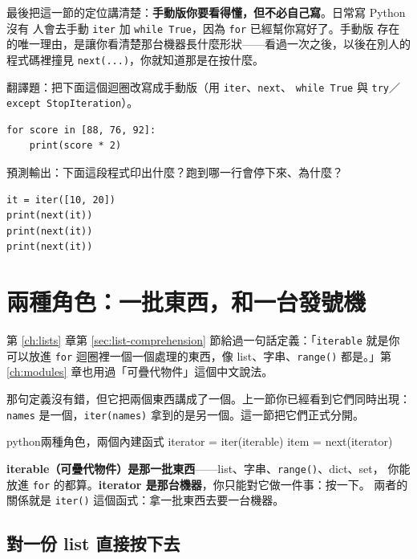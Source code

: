 最後把這一節的定位講清楚：\textbf{手動版你要看得懂，但不必自己寫}。日常寫 Python 沒有
人會去手動 \texttt{iter} 加 \texttt{while True}，因為 \texttt{for} 已經幫你寫好了。手動版
存在的唯一理由，是讓你看清楚那台機器長什麼形狀——看過一次之後，以後在別人的程式碼裡撞見
\texttt{next(...)}，你就知道那是在按什麼。

\begin{drills}[label=drills:what-for-does]
\item 翻譯題：把下面這個迴圈改寫成手動版（用 \texttt{iter}、\texttt{next}、
\texttt{while True} 與 \texttt{try}／\texttt{except StopIteration}）。
\begin{verbatim}
for score in [88, 76, 92]:
    print(score * 2)
\end{verbatim}
\item 預測輸出：下面這段程式印出什麼？跑到哪一行會停下來、為什麼？
\begin{verbatim}
it = iter([10, 20])
print(next(it))
print(next(it))
print(next(it))
\end{verbatim}
\end{drills}

\section{兩種角色：一批東西，和一台發號機}
\label{sec:iterable-vs-iterator}

第 \ref{ch:lists} 章第 \ref{sec:list-comprehension} 節給過一句話定義：「\texttt{iterable}
就是你可以放進 \texttt{for} 迴圈裡一個一個處理的東西，像 list、字串、\texttt{range()}
都是。」第 \ref{ch:modules} 章也用過「可疊代物件」這個中文說法。

那句定義沒有錯，但它把兩個東西講成了一個。上一節你已經看到它們同時出現：\texttt{names}
是一個，\texttt{iter(names)} 拿到的是另一個。這一節把它們正式分開。

\begin{code}{python}{兩種角色，兩個內建函式}
iterator = iter(iterable)
item = next(iterator)
\end{code}

\textbf{iterable（可疊代物件）是那一批東西}——list、字串、\texttt{range()}、dict、set，
你能放進 \texttt{for} 的都算。\textbf{iterator 是那台機器}，你只能對它做一件事：按一下。
兩者的關係就是 \texttt{iter()} 這個函式：拿一批東西去要一台機器。

\subsection*{對一份 list 直接按下去}

